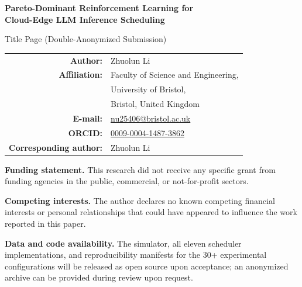 \documentclass[11pt]{article}
\begin{document}
\begin{center}
  {\LARGE\bfseries Pareto-Dominant Reinforcement Learning for\\
   Cloud-Edge LLM Inference Scheduling\par}

  \vspace{2.5em}
  {\large Title Page (Double-Anonymized Submission)\par}
  \vspace{3.5em}

  \begin{tabular}{rl}
    \textbf{Author:}      & Zhuolun Li \\[0.4em]
    \textbf{Affiliation:} & Faculty of Science and Engineering,\\
                          & University of Bristol,\\
                          & Bristol, United Kingdom \\[0.4em]
    \textbf{E-mail:}      & \href{mailto:nu25406@bristol.ac.uk}%
                            {nu25406@bristol.ac.uk} \\[0.4em]
    \textbf{ORCID:}       & \href{https://orcid.org/0009-0004-1487-3862}%
                            {0009-0004-1487-3862} \\[0.4em]
    \textbf{Corresponding author:} & Zhuolun Li \\
  \end{tabular}

  \vspace{3.5em}
\end{center}

\noindent\textbf{Funding statement.} This research did not receive
any specific grant from funding agencies in the public, commercial,
or not-for-profit sectors.

\medskip
\noindent\textbf{Competing interests.} The author declares no known
competing financial interests or personal relationships that could
have appeared to influence the work reported in this paper.

\medskip
\noindent\textbf{Data and code availability.} The simulator, all
eleven scheduler implementations, and reproducibility manifests for
the 30+ experimental configurations will be released as open source
upon acceptance; an anonymized archive can be provided during review
upon request.
\end{document}
